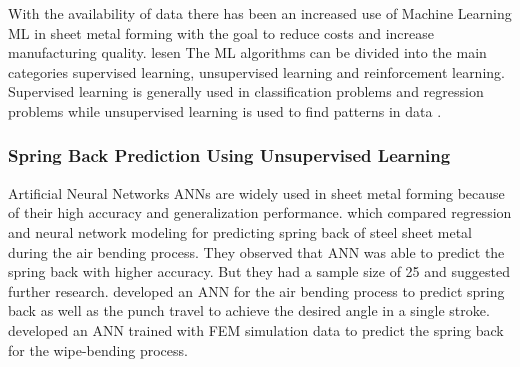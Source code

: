 


With the availability of data there has been an increased use of Machine Learning \ac{ML} in
sheet metal forming with the goal to reduce costs and increase manufacturing quality.
\cite{bock_reviewapplicationmachine_2019} \cite[]{cao_manufacturingadvancedsmart_2019} %
lesen
The ML algorithms can be divided into the main categories supervised learning, unsupervised
learning and reinforcement learning. \cite[]{liu_reinforcementlearningfreeform_2020}
Supervised learning is generally used in classification problems and regression problems while
unsupervised learning is used to find patterns in data \cite[p.
2]{cruz_applicationmachinelearning_2021}.

\subsubsection*{Spring Back Prediction Using Unsupervised Learning}
Artificial Neural Networks \ac{ANN}s are widely used in sheet metal forming because of their high
accuracy and generalization performance. \cite[p. 2]{cruz_applicationmachinelearning_2021}
\cite[]{narayanasamy_comparisonregressionartificial_2012a} which compared regression and neural
network modeling for predicting spring back of steel sheet metal during the air bending process.
They observed that ANN was able to predict the spring back with higher accuracy. But they had a
sample size of 25 and suggested further research.
\cite[]{inamdar_developmentartificialneural_2000} developed an ANN for the air bending process to
predict spring back as well as the punch travel to achieve the desired angle in a single stroke.
\cite[]{kazan_predictionspringbackwipebending_2009} developed an ANN trained with FEM simulation
data to predict the spring back for the wipe-bending process.


